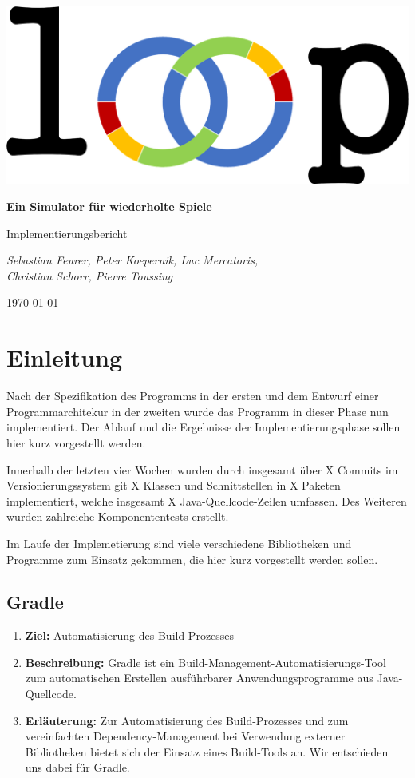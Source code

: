 \documentclass[parskip=full,11pt]{scrartcl}
\begin{document}
\begin{titlepage}
	\centering
	\vspace*{5cm}
	\includegraphics[width = 0.7\linewidth]{img/logo.png}\par
	{\huge\bfseries Ein Simulator für wiederholte Spiele\par}
	{\Large Implementierungsbericht\par}
	\vspace{2cm}
	{\Large\itshape Sebastian Feurer, Peter Koepernik, Luc Mercatoris,\\Christian Schorr, Pierre Toussing\par}
	\vfill
	{\large \today\par}
\end{titlepage}

\tableofcontents
\pagebreak

\section{Einleitung}
Nach der Spezifikation des Programms in der ersten und dem Entwurf einer Programmarchitekur in der zweiten wurde das Programm in dieser Phase nun implementiert. Der Ablauf und die Ergebnisse der Implementierungsphase sollen hier kurz vorgestellt werden.

Innerhalb der letzten vier Wochen wurden durch insgesamt über X Commits im Versionierungssystem git X Klassen und Schnittstellen in X Paketen implementiert, welche  insgesamt X Java-Quellcode-Zeilen umfassen. Des Weiteren wurden zahlreiche Komponententests erstellt.

Im Laufe der Implemetierung sind viele verschiedene Bibliotheken und Programme zum Einsatz gekommen, die hier kurz vorgestellt werden sollen.

\subsection{Gradle}
\begin{enumerate}
\item[] \textbf{Ziel:} Automatisierung des Build-Prozesses
\item[] \textbf{Beschreibung:} Gradle ist ein Build-Management-Automatisierungs-Tool zum automatischen Erstellen ausführbarer Anwendungsprogramme aus Java-Quellcode.
\item[] \textbf{Erläuterung:} Zur Automatisierung des Build-Prozesses und zum vereinfachten Dependency-Management bei Verwendung externer Bibliotheken bietet sich der Einsatz eines Build-Tools an. Wir entschieden uns dabei für Gradle.
\end{enumerate}
\end{document}
